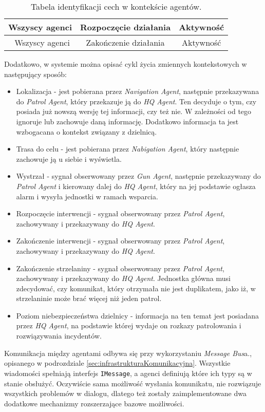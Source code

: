 \begin{table}[H]
\begin{tabular}{|c|c|c|}
     Wszyscy agenci & Rozpoczęcie działania & Aktywność \\ 
     \hline\
     Wszyscy agenci & Zakończenie działania & Aktywność \\ 
     \hline
    \end{tabular}
    \caption{Tabela identyfikacji cech w kontekście agentów.}
    \label{tab:agentsFeaturesCategorization}
\end{table}

\par Dodatkowo, w systemie można opisać cykl życia zmiennych kontekstowych w następujący sposób:
\begin{itemize}
    \item Lokalizacja - jest pobierana przez \emph{Navigation Agent}, następnie przekazywana do \emph{Patrol Agent}, który przekazuje ją do \emph{HQ Agent}. Ten decyduje o tym, czy posiada już nowszą wersję tej informacji, czy też nie. W zależności od tego ignoruje lub zachowuje daną informację. Dodatkowo informacja ta jest wzbogacana o kontekst związany z dzielnicą.
    \item Trasa do celu - jest pobierana przez \emph{Nabigation Agent}, który następnie zachowuje ją u siebie i wyświetla.
    \item Wystrzał - sygnał obserwowany przez \emph{Gun Agent}, następnie przekazywany do \emph{Patrol Agent} i kierowany dalej do \emph{HQ Agent}, który na jej podstawie ogłasza alarm i wysyła jednostki w ramach wsparcia.
    \item Rozpoczęcie interwencji - sygnał obserwowany przez \emph{Patrol Agent}, zachowywany i przekazywany do \emph{HQ Agent}.
    \item Zakończenie interwencji - sygnał obserwowany przez \emph{Patrol Agent}, zachowywany i przekazywany do \emph{HQ Agent}.
    \item Zakończenie strzelaniny - sygnał obserwowany przez \emph{Patrol Agent}, zachowywany i przekazywany do \emph{HQ Agent}. Jednostka główna musi zdecydować, czy komunikat, który otrzymała nie jest duplikatem, jako iż, w strzelaninie może brać więcej niż jeden patrol.
    \item Poziom niebezpieczeństwa dzielnicy - informacja na ten temat jest posiadana przez \emph{HQ Agent}, na podstawie której wydaje on rozkazy patrolowania i rozwiązywania incydentów.
\end{itemize}

\par Komunikacja między agentami odbywa się przy wykorzystaniu \emph{Message Bus}a., opisanego w podrozdziale \ref{sec:infrastrukturaKomunikacyjna}. Wszystkie wiadomości spełniają interfejs \texttt{IMessage}, a agenci definiują które ich typy są w stanie obsłużyć. Oczywiście sama możliwość wysłania komunikatu, nie rozwiązuje wszystkich problemów w dialogu, dlatego też zostały zaimplementowane dwa dodatkowe mechanizmy rozszerzające bazowe możliwości.

